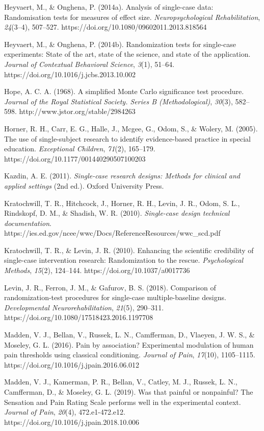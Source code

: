 \documentclass{article}
\begin{document}
Heyvaert, M., \& Onghena, P. (2014a). Analysis of single-case data: Randomisation tests for measures of effect size. \emph{Neuropsychological Rehabilitation}, \emph{24}(3--4), 507--527. https://doi.org/10.1080/09602011.2013.818564

Heyvaert, M., \& Onghena, P. (2014b). Randomization tests for single-case experiments: State of the art, state of the science, and state of the application. \emph{Journal of Contextual Behavioral Science}, \emph{3}(1), 51--64. https://doi.org/10.1016/j.jcbs.2013.10.002

Hope, A. C. A. (1968). A simplified Monte Carlo significance test procedure. \emph{Journal of the Royal Statistical Society. Series B (Methodological)}, \emph{30}(3), 582--598. http://www.jstor.org/stable/2984263

Horner, R. H., Carr, E. G., Halle, J., Mcgee, G., Odom, S., \& Wolery, M. (2005). The use of single-subject research to identify evidence-based practice in special education. \emph{Exceptional Children}, \emph{71}(2), 165--179. https://doi.org/10.1177/001440290507100203

Kazdin, A. E. (2011). \emph{Single-case research designs: Methods for clinical and applied settings} (2nd ed.). Oxford University Press.

Kratochwill, T. R., Hitchcock, J., Horner, R. H., Levin, J. R., Odom, S. L., Rindskopf, D. M., \& Shadish, W. R. (2010). \emph{Single-case design technical documentation}. https://ies.ed.gov/ncee/wwc/Docs/ReferenceResources/wwc\_scd.pdf

Kratochwill, T. R., \& Levin, J. R. (2010). Enhancing the scientific credibility of single-case intervention research: Randomization to the rescue. \emph{Psychological Methods}, \emph{15}(2), 124--144. https://doi.org/10.1037/a0017736

Levin, J. R., Ferron, J. M., \& Gafurov, B. S. (2018). Comparison of randomization-test procedures for single-case multiple-baseline designs. \emph{Developmental Neurorehabilitation}, \emph{21}(5), 290--311. https://doi.org/10.1080/17518423.2016.1197708

Madden, V. J., Bellan, V., Russek, L. N., Camfferman, D., Vlaeyen, J. W. S., \& Moseley, G. L. (2016). Pain by association? Experimental modulation of human pain thresholds using classical conditioning. \emph{Journal of Pain}, \emph{17}(10), 1105--1115. https://doi.org/10.1016/j.jpain.2016.06.012

Madden, V. J., Kamerman, P. R., Bellan, V., Catley, M. J., Russek, L. N., Camfferman, D., \& Moseley, G. L. (2019). Was that painful or nonpainful? The Sensation and Pain Rating Scale performs well in the experimental context. \emph{Journal of Pain}, \emph{20}(4), 472.e1-472.e12. https://doi.org/10.1016/j.jpain.2018.10.006
\end{document}
